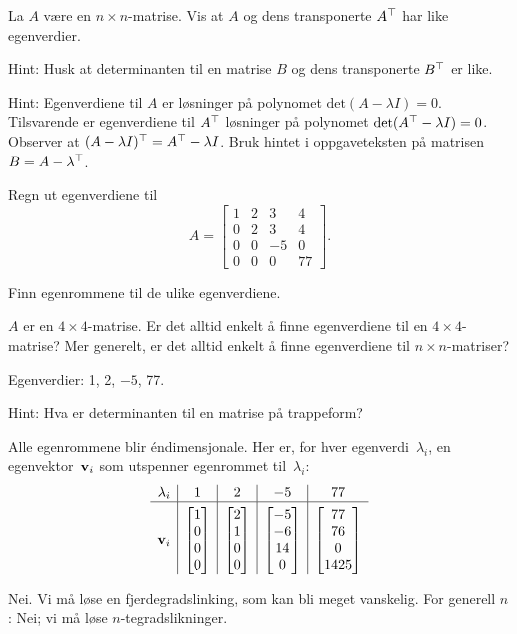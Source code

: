 \begin{oppgave}
La $A$ være en $n\times n$-matrise. Vis at $A$ og dens transponerte $A^\top$ har like egenverdier.

\noindent
Hint: Husk at determinanten til en matrise $B$ og dens transponerte $B^\top$ er like.
\end{oppgave}

\begin{losning}
Hint: Egenverdiene til $A$ er løsninger på polynomet $\text{det}(A-\lambda I)=0$. Tilsvarende er egenverdiene til $A^\top$ løsninger på polynomet $\text{det}(A^\top-\lambda I)=0$. Observer at $(A-\lambda I)^\top=A^\top-\lambda I$. Bruk hintet i oppgaveteksten på matrisen $B=A-\lambda^\top$.
\end{losning}



\begin{oppgave}
\begin{punkt}
Regn ut egenverdiene til $$A=\begin{bmatrix}
1 & 2 & 3 & 4\\
0 & 2 & 3 & 4\\
0 & 0 & -5 & 0\\
0 & 0 & 0 & 77
\end{bmatrix}.
$$

\end{punkt}

\begin{punkt}
Finn egenrommene til de ulike egenverdiene.
\end{punkt}

\begin{punkt}
$A$ er en $4\times 4$-matrise. Er det alltid enkelt å finne egenverdiene til en $4\times 4$-matrise? Mer generelt, er det alltid enkelt å finne egenverdiene til $n\times n$-matriser?
\end{punkt}

\end{oppgave}


\begin{losning}

\begin{punkt}
Egenverdier: 1, 2, $-5$, 77. 

\noindent
Hint: Hva er determinanten til en matrise på trappeform?
\end{punkt}

\begin{punkt}
Alle egenrommene blir éndimensjonale.  Her er, for hver
egenverdi~$\lambda_i$, en egenvektor~$\mathbf{v}_i$ som utspenner egenrommet
til~$\lambda_i$:
\[
\begin{array}{r|c|c|c|c}
\lambda_i &
1 & 2 & -5 & 77 \\ \hline
\rule{0pt}{30pt}
\v_i &
\vvvv{1}{0}{0}{0} &
\vvvv{2}{1}{0}{0} &
\vvvv{-5}{-6}{14}{0} &
\vvvv{77}{76}{0}{1425}
\end{array}
\]
\end{punkt}

\begin{punkt}
Nei. Vi må løse en fjerdegradslinking, som kan bli meget vanskelig. For generell $n$: Nei; vi må løse $n$-tegradslikninger.
\end{punkt}

\end{losning}


